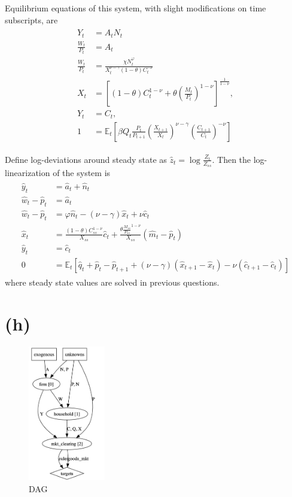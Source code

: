 \documentclass[12pt]{article}
\begin{document}
Equilibrium equations of this system, 
with slight modifications on time subscripts, are
\begin{align*}
\begin{aligned}
Y_t &= A_t N_t \\
\frac{W_t}{P_t} &= A_t \\
\frac{W_t}{P_t} &= \frac{\chi N_t^{\varphi} }{X_t^{\nu-\gamma}(1-\theta)C_t^{-\nu}} \\
X_t &= \left[ (1-\theta)C_t^{1-\nu} 
+ \theta \left(\frac{M_t}{P_t} \right)^{1-\nu} \right]^{\frac{1}{1-\nu}}, \\
Y_t &= C_t, \\
1 &= \mathbb{E}_t \left[ \beta Q_{t} \frac{P_t}{P_{t+1}} 
\left( \frac{X_{t+1}}{X_t} \right)^{\nu-\gamma} 
\left( \frac{C_{t+1}}{C_t} \right)^{-\nu} \right]
\end{aligned}
\end{align*}

Define log-deviations around steady state as $\hat{z}_t = \log \frac{Z_t}{Z_{ss}}$.
Then the log-linearization of the system is
\begin{align*}
\begin{aligned}
\hat{y}_t &= \hat{a}_t + \hat{n}_t \\
\hat{w}_t - \hat{p}_t &= \hat{a}_t \\
\hat{w}_t - \hat{p}_t &= \varphi \hat{n}_t - (\nu-\gamma)\hat{x}_t + \nu \hat{c}_t \\
\hat{x}_{t} &= \frac{(1-\theta)C^{1-\nu}_{ss}}{X_{ss}}\hat{c}_{t} +
\frac{\theta \frac{M_{ss}}{P_{ss}}^{1-\nu}}{X_{ss}} (\hat{m}_{t} - \hat{p}_{t}) \\
\hat{y}_t &= \hat{c}_t \\
0 &= \mathbb{E}_t \left[ \hat{q}_t + \hat{p}_t - \hat{p}_{t+1} 
+ (\nu-\gamma)(\hat{x}_{t+1} - \hat{x}_t) - \nu (\hat{c}_{t+1} - \hat{c}_t) \right]
\end{aligned}
\end{align*}
where steady state values are solved in previous questions.

\section*{(h)}

\begin{figure}[ht]
    \centering
    \includegraphics[width=0.3\textwidth]{figs/dag.png}
    \caption{DAG}
    \label{fig:dag}
\end{figure}
\end{document}
